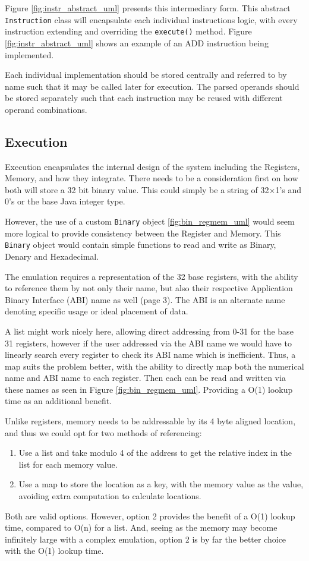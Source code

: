 Figure \ref{fig:instr_abstract_uml} presents this intermediary form. This abstract \texttt{Instruction} class will encapsulate each individual instructions logic, with every instruction extending and overriding the \verb|execute()| method. Figure \ref{fig:instr_abstract_uml} shows an example of an ADD instruction being implemented.

Each individual implementation should be stored centrally and referred to by name such that it may be called later for execution. The parsed operands should be stored separately such that each instruction may be reused with different operand combinations.


\subsection{Execution}
Execution encapsulates the internal design of the system including the Registers, Memory, and how they integrate. There needs to be a consideration first on how both will store a 32 bit binary value. This could simply be a string of 32$\times$1's and 0's or the base Java integer type.

However, the use of a custom \texttt{Binary} object \ref{fig:bin_regmem_uml} would seem more logical to provide consistency between the Register and Memory. This \texttt{Binary} object would contain simple functions to read and write as Binary, Denary and Hexadecimal.

The emulation requires a representation of the 32 base registers, with the ability to reference them by not only their name, but also their respective Application Binary Interface (ABI) name as well \cite{riscvinternational_2014_calling}(page 3). The ABI is an alternate name denoting specific usage or ideal placement of data. 

A list might work nicely here, allowing direct addressing from 0-31 for the base 31 registers, however if the user addressed via the ABI name we would have to linearly search every register to check its ABI name which is inefficient. Thus, a map suits the problem better, with the ability to directly map both the numerical name and ABI name to each register. Then each can be read and written via these names as seen in Figure \ref{fig:bin_regmem_uml}. Providing a O(1) lookup time as an additional benefit.

Unlike registers, memory needs to be addressable by its 4 byte aligned location, and thus we could opt for two methods of referencing:
\begin{enumerate}
    \item Use a list and take modulo 4 of the address to get the relative index in the list for each memory value.
    \item Use a map to store the location as a key, with the memory value as the value, avoiding extra computation to calculate locations.
\end{enumerate}
Both are valid options. However, option 2 provides the benefit of a O(1) lookup time, compared to O(n) for a list. And, seeing as the memory may become infinitely large with a complex emulation, option 2 is by far the better choice with the O(1) lookup time.

